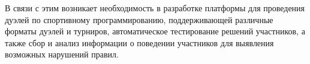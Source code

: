 В связи с этим возникает необходимость в разработке платформы для проведения дуэлей по спортивному программированию,
поддерживающей различные форматы дуэлей и турниров, автоматическое тестирование решений участников,
а также сбор и анализ информации о поведении участников для выявления возможных нарушений правил.
